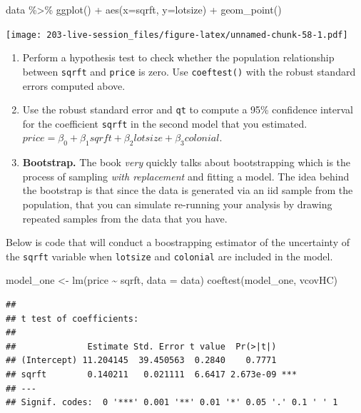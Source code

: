 \documentclass[
]{book}
\newenvironment{Shaded}{\begin{snugshade}}{\end{snugshade}}
\newcommand{\AttributeTok}[1]{\textcolor[rgb]{0.77,0.63,0.00}{#1}}
\newcommand{\FunctionTok}[1]{\textcolor[rgb]{0.00,0.00,0.00}{#1}}
\newcommand{\NormalTok}[1]{#1}
\newcommand{\OtherTok}[1]{\textcolor[rgb]{0.56,0.35,0.01}{#1}}
\newcommand{\SpecialCharTok}[1]{\textcolor[rgb]{0.00,0.00,0.00}{#1}}
\theoremstyle{definition}
\theoremstyle{definition}
\theoremstyle{definition}
\theoremstyle{definition}
\theoremstyle{remark}
\begin{document}
\begin{Shaded}
\begin{Highlighting}[]
\NormalTok{data }\SpecialCharTok{\%\textgreater{}\%} 
  \FunctionTok{ggplot}\NormalTok{() }\SpecialCharTok{+} 
  \FunctionTok{aes}\NormalTok{(}\AttributeTok{x=}\NormalTok{sqrft, }\AttributeTok{y=}\NormalTok{lotsize) }\SpecialCharTok{+} 
  \FunctionTok{geom\_point}\NormalTok{()}
\end{Highlighting}
\end{Shaded}

\texttt{[image: 203-live-session\_files/figure-latex/unnamed-chunk-58-1.pdf]}

\begin{enumerate}
\def\labelenumi{\arabic{enumi}.}
\setcounter{enumi}{2}
\item
  Perform a hypothesis test to check whether the population relationship between \texttt{sqrft} and \texttt{price} is zero. Use \texttt{coeftest()} with the robust standard errors computed above.
\item
  Use the robust standard error and \texttt{qt} to compute a 95\% confidence interval for the coefficient \texttt{sqrft} in the second model that you estimated. \(price = \beta_{0} + \beta_{1} sqrft + \beta_{2} lotsize + \beta_{3} colonial\).
\item
  \textbf{Bootstrap.} The book \emph{very} quickly talks about bootstrapping which is the process of sampling \emph{with replacement} and fitting a model. The idea behind the bootstrap is that since the data is generated via an iid sample from the population, that you can simulate re-running your analysis by drawing repeated samples from the data that you have.
\end{enumerate}

Below is code that will conduct a boostrapping estimator of the uncertainty of the \texttt{sqrft} variable when \texttt{lotsize} and \texttt{colonial} are included in the model.

\begin{Shaded}
\begin{Highlighting}[]
\NormalTok{model\_one }\OtherTok{\textless{}{-}} \FunctionTok{lm}\NormalTok{(price }\SpecialCharTok{\textasciitilde{}}\NormalTok{ sqrft, }\AttributeTok{data =}\NormalTok{ data)}
\FunctionTok{coeftest}\NormalTok{(model\_one, vcovHC)}
\end{Highlighting}
\end{Shaded}

\begin{verbatim}
## 
## t test of coefficients:
## 
##              Estimate Std. Error t value  Pr(>|t|)    
## (Intercept) 11.204145  39.450563  0.2840    0.7771    
## sqrft        0.140211   0.021111  6.6417 2.673e-09 ***
## ---
## Signif. codes:  0 '***' 0.001 '**' 0.01 '*' 0.05 '.' 0.1 ' ' 1
\end{verbatim}
\end{document}
